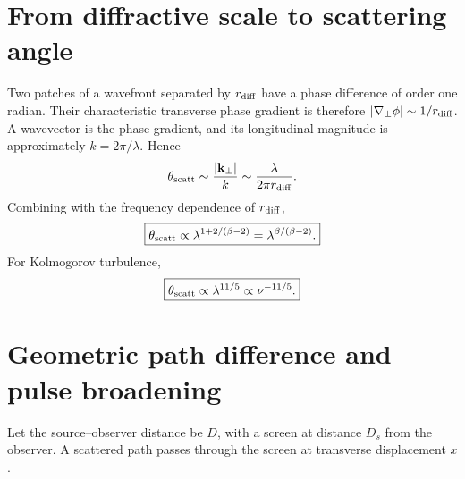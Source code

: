 \section{From diffractive scale to scattering angle}
Two patches of a wavefront separated by $r_{\rm diff}$ have a phase difference of order one radian. Their characteristic transverse phase gradient is therefore $|\nabla_\perp\phi|\sim 1/r_{\rm diff}$. A wavevector is the phase gradient, and its longitudinal magnitude is approximately $k=2\pi/\lambda$. Hence
\begin{equation}
\theta_{\rm scatt}\sim\frac{|\mathbf k_\perp|}{k}
\sim\frac{\lambda}{2\pi r_{\rm diff}}.
\end{equation}
Combining with the frequency dependence of $r_{\rm diff}$,
\begin{equation}
\boxed{\theta_{\rm scatt}\propto
\lambda^{1+2/(\beta-2)}
=\lambda^{\beta/(\beta-2)}.}
\end{equation}
For Kolmogorov turbulence,
\begin{equation}
\boxed{\theta_{\rm scatt}\propto\lambda^{11/5}\propto\nu^{-11/5}.}
\end{equation}

\section{Geometric path difference and pulse broadening}
Let the source--observer distance be $D$, with a screen at distance $D_s$ from the observer. A scattered path passes through the screen at transverse displacement $x$.

\begin{center}
\end{center}

